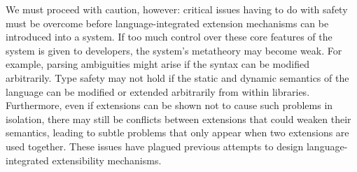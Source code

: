 We must proceed with caution, however: critical issues having to do with {safety} must be overcome before language-integrated extension mechanisms can be introduced into a system. If too much control over  these core features of the system is given  to developers, the system's metatheory may become weak. 
For example, parsing ambiguities might arise if the syntax can be modified arbitrarily. Type safety  may not hold if the static and dynamic semantics of the language can be modified or extended arbitrarily from within libraries. Furthermore, even if extensions can be shown not to cause such problems in isolation, there may still be conflicts between extensions that could weaken their semantics, leading to subtle problems that only appear when two extensions are used together. %
These issues have plagued previous attempts to design language-integrated extensibility mechanisms.%





